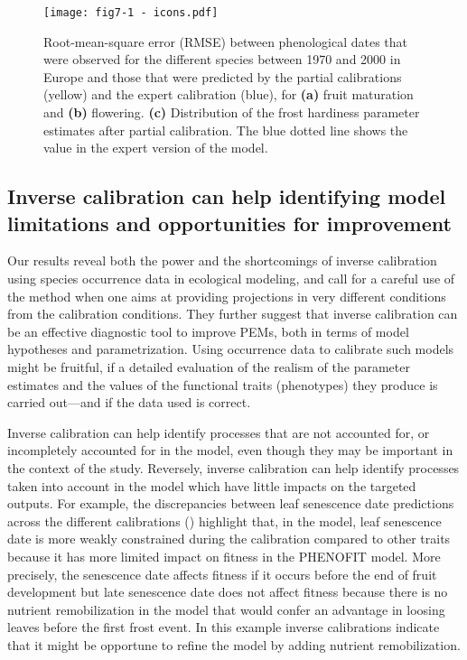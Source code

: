 \documentclass[preprint,12pt,authoryear]{elsarticle}
\begin{document}
{\begin{figure}
\centering
\begin{subcaptiongroup}
\label{fig:5A} 
\label{fig:5B}
\label{fig:5C}
\end{subcaptiongroup}
\vspace*{-1cm}
\centerline{\texttt{[image: fig7-1 - icons.pdf]}}
\caption{Root-mean-square error (RMSE) between phenological dates that were observed for the different species between 1970 and 2000 in Europe and those that were predicted by the partial calibrations (yellow) and the expert calibration (blue), for \textbf{(a)} fruit maturation and \textbf{(b)} flowering. \textbf{(c)} Distribution of the frost hardiness parameter estimates after partial calibration. The blue dotted line shows the value in the expert version of the model.}
\label{fig:5}
\end{figure}


\subsection{Inverse calibration can help identifying model limitations and opportunities for improvement}

Our results reveal both the power and the shortcomings of inverse calibration \textcolor{customred}{using species occurrence data} in ecological modeling, and call for a careful use of the method when one aims at providing projections in very different conditions from the calibration conditions. They further suggest that inverse calibration can be an effective diagnostic tool to improve PEMs, both in terms of model hypotheses and parametrization. Using occurrence data to calibrate such models might be fruitful, if a detailed evaluation of the realism of the parameter estimates and the values of the functional traits (phenotypes) they produce is carried out\textcolor{customred}{---and if the data used is correct.}

Inverse calibration can help identify processes that are not accounted for, or incompletely accounted for in the model, even though they may be important in the context of the study.  Reversely, inverse calibration can help identify processes taken into account in the model which have little impacts on the targeted outputs. For example, the discrepancies between leaf senescence date predictions across the different calibrations () highlight that, in the model, leaf senescence date is more weakly constrained during the calibration compared to other traits because it has more limited impact on fitness \textcolor{customred}{in the PHENOFIT model}. More precisely, the senescence date affects fitness if it occurs before the end of fruit development but late senescence date does not affect fitness because there is no nutrient remobilization in the model that would confer an advantage in loosing leaves before the first frost event. In this example inverse calibrations indicate that it might be opportune to refine the model by adding nutrient remobilization.

}
\end{document}
